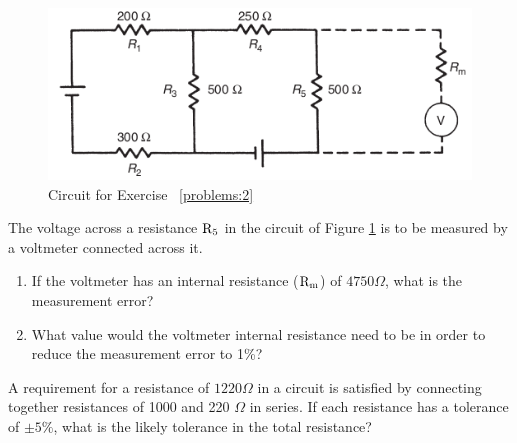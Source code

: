 \documentclass[a4paper,11pt]{book}
\begin{document}
\begin{question}\label{problems:2}

\begin{figure}[h!]\label{fig:problem2}
\centering
  \includegraphics[width=0.8\linewidth]{problem2}
  \caption{Circuit for Exercise ~\ref{problems:2}} 
\end{figure}

The voltage across a resistance $\rm R_5$ in the circuit of Figure \ref{fig:problem2} is to be measured by a voltmeter connected across it.
\begin{enumerate}
\item If the voltmeter has an internal resistance ($\rm R_m$) of $4750 \Omega$, what is the measurement error?
\item What value would the voltmeter internal resistance need to be in order to reduce the measurement error to 1\%?
\end{enumerate}

\examspace*{15em}

\end{question}
\begin{solution}


\end{solution}


\begin{question}

A requirement for a resistance of $1220 \Omega$ in a circuit is satisfied by connecting together resistances of 1000 and 220 $\Omega$ in series. If each resistance has a tolerance of $\pm 5\%$, what is the likely tolerance in the total resistance?
\examspace*{10em}

\end{question}
\begin{solution}


\end{solution}
\end{document}
